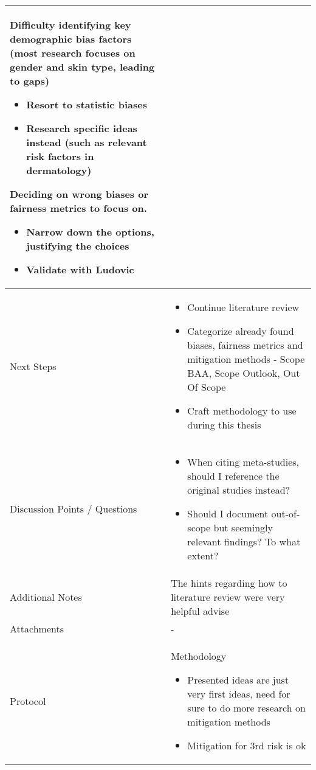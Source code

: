 \documentclass[a4paper,11pt]{article}
\begin{document}
\begin{longtable}{|p{3.5cm}|p{12cm}|}
	    Difficulty identifying key demographic bias factors (most research focuses on gender and skin type, leading to gaps)
		\begin{itemize}
			\item Resort to statistic biases
			\item Research specific ideas instead (such as relevant risk factors in dermatology)
		\end{itemize}
		
		Deciding on wrong biases or fairness metrics to focus on.
		\begin{itemize}
			\item Narrow down the options, justifying the choices
			\item Validate with Ludovic
		\end{itemize}
		
		\\
		\hline
		Next Steps & \begin{itemize}
			\item Continue literature review
			\item Categorize already found biases, fairness metrics and mitigation methods - Scope BAA, Scope Outlook, Out Of Scope
			\item Craft methodology to use during this thesis
		\end{itemize} \\
		\hline
		Discussion Points / Questions & \begin{itemize}
			\item When citing meta-studies, should I reference the original studies instead?
			\item Should I document out-of-scope but seemingly relevant findings? To what extent?
		\end{itemize} \\
		\hline
		Additional Notes & The hints regarding how to literature review were very helpful advise\\
		\hline
		Attachments  & - \\
		\hline
		Protocol  & 
		Methodology
		\begin{itemize}
			\item Presented ideas are just very first ideas, need for sure to do more research on mitigation methods
			\item Mitigation for 3rd risk is ok
		\end{itemize}
		

\end{longtable}
\end{document}
